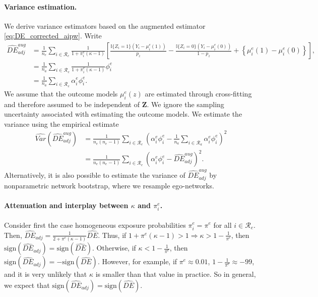 \documentclass[11pt]{article}
\theoremstyle{definition}
\def \bZ {\boldsymbol{Z}}
\def \cR {\mathcal{R}}
\begin{document}
\paragraph{Variance estimation.} We derive variance estimators based on the augmented estimator \eqref{eq:DE_corrected_aipw}. 
Write
\begin{align*}
    \widehat{DE}_{adj}^{aug} 
        &= 
    \frac{1}{n_e}
    \sum_{i \in \cR_e}
    \frac{1}{1 + \pi_i^e(\kappa-1)}
    \left[
    \frac{
    \mathbb{I}\{
    Z_i=1\}\left(Y_i - \mu^e_i(1) \right)}{p_z} 
    -
    \frac{
    \mathbb{I}\{Z_i=0\}\left(Y_i - \mu^e_i(0) \right)}{1 - p_z} 
    + \left\{\mu^e_i(1) - \mu^e_i(0) \right\}
    \right],
    \\ &=
    \frac{1}{n_a}
    \sum_{i \in \cR_e}
    \frac{1}{1 + \pi_i^e(\kappa-1)} \phi_i^e
    \\ &=
    \frac{1}{n_a}
    \sum_{i \in \cR_e}
    \alpha_i^e \phi_i^e.
\end{align*}
We assume that the outcome models $\mu^e_i(z)$ are estimated through cross-fitting \citep{Chernozhukov2018} and therefore assumed to be independent of $\bZ$. We ignore the sampling uncertainty associated with estimating the outcome models. 
We estimate the variance using the empirical estimate
\begin{equation*}
    \begin{aligned}
        \widehat{Var}\left(\widehat{DE}_{adj}^{aug}\right)
        &= 
        \frac{1}{n_e(n_e-1)}
        \sum_{i\in \cR_e}
        \left(
        \alpha_i^e \phi_i^e 
        -
        \frac{1}{n_a}
    \sum_{i \in \cR_a}
    \alpha_i^e \phi_i^e
        \right)^2
        \\ &=
        \frac{1}{n_e(n_e-1)}
        \sum_{i\in \cR_e}
        \left(
        \alpha_i^e \phi_i^e 
        -
       \widehat{DE}_{adj}^{aug}
        \right)^2.
    \end{aligned}
\end{equation*}
Alternatively, it is also possible to estimate the variance of $\widehat{DE}_{adj}^{aug}$ by nonparametric network bootstrap, where we resample ego-networks.

\paragraph{Attenuation and interplay between $\kappa$ and $\pi_i^e$.}
Consider first the case homogeneous exposure probabilities $\pi_i^e = \pi^e$ for all $i\in\cR_e$.
Then, $\widehat{DE}_{adj} = \frac{1}{2+\pi^e(\kappa-1)}\widehat{DE}$. 
Thus, if $1 + \pi^e(\kappa-1) > 1 \Rightarrow \kappa > 1 - \frac{1}{\pi^e}$, 
    then $\text{sign}(\widehat{DE}_{adj}) = \text{sign}(\widehat{DE})$.
Otherwise, if $\kappa < 1 - \frac{1}{\pi^e}$, then $\text{sign}(\widehat{DE}_{adj}) = -\text{sign}(\widehat{DE})$.
However, for example, if $\pi^e \approx 0.01$, $1 - \frac{1}{\pi^e} \approx -99$,
 and it is very unlikely that $\kappa$ is smaller than that value in practice.
 So in general, we expect that $\text{sign}(\widehat{DE}_{adj}) = \text{sign}(\widehat{DE})$.
 
\end{document}
